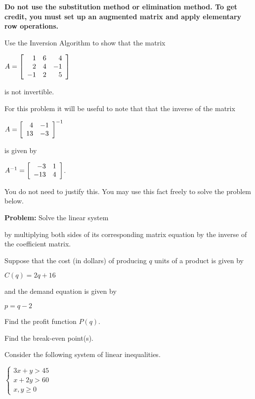 \documentclass[11pt, legalpaper]{exam}
\begin{document}
\begin{questions}
\textbf{Do not use the substitution method or elimination method.  To get credit, you must set up an augmented matrix and apply elementary row operations.}
\newpage

\question[4] Use the Inversion Algorithm to show that the matrix
\begin{center}
$A = \MATRIX{rrr}{1 & 6 & 4\\2 & 4 & -1\\-1 & 2 & 5}$
\end{center}
is not invertible.
\newpage

\question[4] For this problem it will be useful to note that that the inverse of the matrix
\begin{center}
$A = \MATRIX{rr}{4 & -1\\13 & -3}^{-1}$
\end{center} is given by
\begin{center}
$A^{-1} = \MATRIX{rr}{-3 & 1\\-13 & 4}$.
\end{center}
You do not need to justify this.  You may use this fact freely to solve the problem below.
\vsp

\noindent \textbf{Problem:} Solve the linear system
\begin{center}
\end{center}
by multiplying both sides of its corresponding matrix equation by the inverse of the coefficient matrix.
\newpage

\question[6] Suppose that the cost (in dollars) of producing $q$ units of a product is given by
\begin{center}
$C(q) = 2q + 16$
\end{center}
and the demand equation is given by
\begin{center}
$p = q - 2$
\end{center}
\begin{compactenum}[(a)]
\item Find the profit function $P(q)$.
\vspace{5cm}

\item Find the break-even point(s).
\vfill

\end{compactenum}
\newpage

\question[5] Consider the following system of linear inequalities.
\begin{center}
$\begin{cases}
3x+y > 45\\
x+2y > 60\\
x,y\geq 0
\end{cases}$
\end{center}
\vfill


\end{questions}
\end{document}
